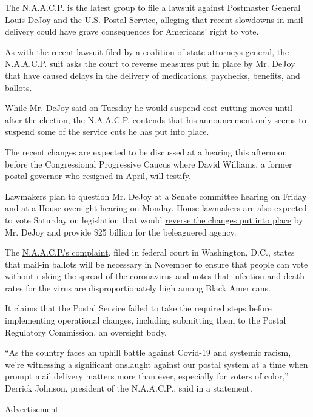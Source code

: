The N.A.A.C.P. is the latest group to file a lawsuit against Postmaster
General Louis DeJoy and the U.S. Postal Service, alleging that recent
slowdowns in mail delivery could have grave consequences for Americans'
right to vote.

As with the recent lawsuit filed by a coalition of state attorneys
general, the N.A.A.C.P. suit asks the court to reverse measures put in
place by Mr. DeJoy that have caused delays in the delivery of
medications, paychecks, benefits, and ballots.

While Mr. DeJoy said on Tuesday he would
\href{https://www.nytimes3xbfgragh.onion/2020/08/18/us/politics/postal-service-suspends-changes.html}{suspend
cost-cutting moves} until after the election, the N.A.A.C.P. contends
that his announcement only seems to suspend some of the service cuts he
has put into place.

The recent changes are expected to be discussed at a hearing this
afternoon before the Congressional Progressive Caucus where David
Williams, a former postal governor who resigned in April, will testify.

Lawmakers plan to question Mr. DeJoy at a Senate committee hearing on
Friday and at a House oversight hearing on Monday. House lawmakers are
also expected to vote Saturday on legislation that would
\href{https://rules.house.gov/sites/democrats.rules.house.gov/files/BILLS-116HR8015-RCP116-61.pdf}{reverse
the changes put into place} by Mr. DeJoy and provide \$25 billion for
the beleaguered agency.

The
\href{https://www.naacpldf.org/wp-content/uploads/1-Complaint.pdf}{N.A.A.C.P.'s
complaint}, filed in federal court in Washington, D.C., states that
mail-in ballots will be necessary in November to ensure that people can
vote without risking the spread of the coronavirus and notes that
infection and death rates for the virus are disproportionately high
among Black Americans.

It claims that the Postal Service failed to take the required steps
before implementing operational changes, including submitting them to
the Postal Regulatory Commission, an oversight body.

``As the country faces an uphill battle against Covid-19 and systemic
racism, we're witnessing a significant onslaught against our postal
system at a time when prompt mail delivery matters more than ever,
especially for voters of color,'' Derrick Johnson, president of the
N.A.A.C.P., said in a statement.

Advertisement

